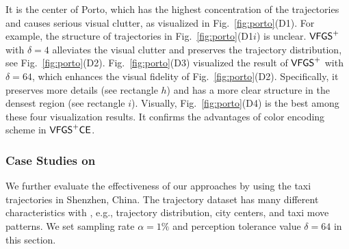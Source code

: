  It is the center of Porto, which has the highest concentration of the trajectories and causes serious visual clutter, as visualized in Fig.~\ref{fig:porto}(D1).
For example, the structure of trajectories in Fig.~\ref{fig:porto}(D1$i$) is unclear.
$\mathsf{VFGS}^{+}$ with $\delta=4$ alleviates the visual clutter and preserves the trajectory distribution, see Fig.~\ref{fig:porto}(D2).
Fig.~\ref{fig:porto}(D3) visualized the result of $\mathsf{VFGS}^{+}$ with $\delta=64$, which enhances the visual fidelity of Fig.~\ref{fig:porto}(D2).
Specifically, it preserves more details (see rectangle $h$) and has a more clear structure in the {densest} region (see rectangle $i$).
Visually, Fig.~\ref{fig:porto}(D4) is the best among these four visualization results.
It confirms the advantages of color encoding scheme in $\mathsf{VFGS}^{+}\mathsf{CE}$.



\vspace{-2mm}

\subsubsection{Case Studies on \sz}\label{sec:sz}
We further evaluate the effectiveness of our approaches by using the taxi trajectories in Shenzhen, China.
The \sz{} trajectory dataset has many different characteristics with \pt{}, e.g., trajectory distribution, city centers, and taxi move patterns.
We set sampling rate $\alpha=1\%$ and perception tolerance value $\delta = 64$ in this section.

